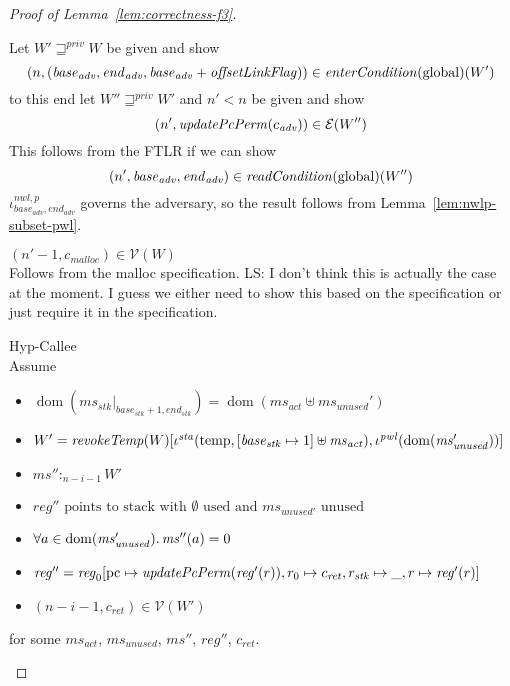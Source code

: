 \documentclass[a4paper]{article}
\DeclareMathOperator{\dom}{dom}
\newcommand\lau[1]{{\color{purple} \sf \footnotesize {LS: #1}}\\}
\newcommand{\var}[1]{\mathit{#1}}
\newcommand{\hs}{\var{ms}}
\newcommand{\ms}{\hs}
\newcommand{\pcreg}{\mathrm{pc}}
\newcommand{\start}{\var{base}}
\newcommand{\addrend}{\var{end}}
\newcommand{\reg}{\var{reg}}
\newcommand{\heap}{\var{mem}}
\newcommand{\adv}{\var{adv}}
\newcommand{\stk}{\var{stk}}
\newcommand{\nwl}{\var{nwl}}
\newcommand{\pwl}{\var{pwl}}
\newcommand{\sta}{\var{sta}}
\newcommand{\olf}{\var{offsetLinkFlag}}
\newcommand{\plainfun}[2]{
  \ifthenelse{\equal{#2}{}}
  {\mathit{#1}}
  {\mathit{#1}(#2)}
}
\newcommand{\updatePcPerm}[1]{\plainfun{updatePcPerm}{#1}}
\newcommand{\readCond}[1]{\plainfun{readCondition}{#1}}
\newcommand{\entryCond}[1]{\plainfun{enterCondition}{#1}}
\newcommand{\revokeTemp}[1]{\plainfun{revokeTemp}{#1}}
\newcommand{\futurestr}{\mathbin{\sqsupseteq}^{\var{priv}}}
\newcommand{\heapSat}[3][\heap]{#1 :_{#2} #3}
\newcommand{\memSat}[3][n]{\heapSat[#2]{#1}{#3}}
\newcommand{\codelabel}[1]{\mathit{#1}}
\newcommand{\malloc}{\codelabel{malloc}}
\newcommand{\asmType}{\plaindom{AsmType}}
\newcommand{\plaindom}[1]{\mathrm{#1}}
\newcommand{\intr}[2]{\mathcal{#1}}
\newcommand{\valueintr}[1]{\intr{V}{#1}}
\newcommand{\exprintr}[1]{\intr{E}{#1}}
\newcommand{\stdvr}{\valueintr{\asmType}}
\newcommand{\stder}{\exprintr{\asmType}}
\newcommand{\npair}[2][n]{\left(#1,#2 \right)}
\newcommand{\plainperm}[1]{\mathrm{#1}}
\newcommand{\glob}{\plainperm{global}}
\newcommand{\plainview}[1]{\mathrm{#1}}
\newcommand{\temp}{\plainview{temp}}
\begin{document}
\begin{proof}[Proof of Lemma~\ref{lem:correctness-f3}]
\begin{enumproof}
\begin{enumproof}
\begin{enumproof}
            Let $W' \futurestr W$ be given and show
            \[
              \npair{(\start_\adv,\addrend_\adv,\start_\adv+\olf)} \in \entryCond{}(\glob)(W')
            \]
            to this end let $W'' \futurestr W'$ and $n' < n$ be given and show
            \[
              \npair[n']{\updatePcPerm{c_\adv}} \in \stder(W'')
            \]
            This follows from the FTLR if we can show
            \[
              \npair[n']{\start_\adv,\addrend_\adv} \in \readCond{}(\glob)(W'')
            \]
            $\iota^{\nwl,p}_{\start_\adv,\addrend_\adv}$ governs the adversary, so the result follows from Lemma~\ref{lem:nwlp-subset-pwl}.
          \item $\npair[n'-1]{c_\malloc} \in \stdvr(W)$\\
            Follows from the malloc specification.
            \lau{I don't think this is actually the case at the moment. I guess we either need to show this based on the specification or just require it in the specification.}
        \end{enumproof}
    \end{enumproof}
  \item Hyp-Callee\\
    Assume
    \begin{itemize}
    \item $\dom(\ms_\stk |_{\start_\stk+1,\addrend_\stk}) = \dom(\ms_{\mathit{act}} \uplus \ms_{\mathit{unused}}')$
    \item $W' = \revokeTemp{W}[\iota^{\sta}(\temp,[\start_\stk \mapsto 1]\uplus\ms_{\mathit{act}}),\iota^{\pwl}(\dom(\ms_{\mathit{unused}}'))]$
    \item $\memSat[n-i-1]{\ms''}{W'}$
    \item $\reg'' \text{ points to stack with $\emptyset$ used and $\ms_{\mathit{unused}'}$ unused}$
    \item $\forall a \in \dom(\ms_{\var{unused}}') \ldotp \ms''(a) = 0$
    \item $\reg''= \reg_0[\pcreg\mapsto\updatePcPerm{\reg'(r)},r_0 \mapsto c_{\mathit{ret}}, r_\stk \mapsto \_, r \mapsto \reg'(r)]$ 
    \item $\npair[n-i-1]{c_{\mathit{ret}}} \in \stdvr(W')$
    \end{itemize}
    for some $\ms_{\mathit{act}}$, $\ms_{\mathit{unused}}$, $\ms''$, $\reg''$, $c_{\mathit{ret}}$.
    

\end{enumproof}
\end{proof}
\end{document}
